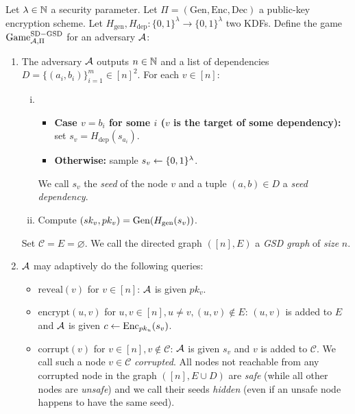 \begin{definition}

	Let $\lambda \in \mathbb{N}$ a security parameter.  Let $\Pi = (\mathrm{Gen}, \mathrm{Enc}, \mathrm{Dec})$ a public-key encryption scheme. Let $H_{\mathrm{gen}}, H_{\mathrm{dep}} \colon \{0, 1\}^\lambda \to \{0, 1\}^\lambda$ two KDFs. Define the game $\mathrm{Game}_{\mathcal{A}, \Pi}^{\mathrm{SD-GSD}}$ for an adversary $\mathcal{A}$:
	\begin{enumerate}[1.]
		\item \label{def:sd-gsd-game-step-1} The adversary $\mathcal{A}$ outputs $n \in \mathbb{N}$ and a list of dependencies $D = \{(a_{i}, b_{i})\}_{i=1}^m \in [n]^2$. For each $v \in [n]$:
		      \begin{enumerate}[(i)]
			      \item \begin{itemize}
				            \item \textbf{Case $v = b_i$ for some $i$ ($v$ is the target of some dependency):} set $s_v = H_{\mathrm{dep}}(s_{a_i})$.
				            \item \textbf{Otherwise:} sample $s_v \leftarrow \{0, 1\}^\lambda$.
			            \end{itemize}
			            We call $s_v$ the \emph{seed} of the node $v$ and a tuple $(a, b) \in D$ a \emph{seed dependency}.
			      \item Compute $(sk_v, pk_v) = \mathrm{Gen}(H_\mathrm{gen}(s_v))$. 
		      \end{enumerate}
		      Set $\mathcal{C} = E = \varnothing$. We call the directed graph $([n], E)$ a \emph{GSD graph} of \emph{size} $n$.
		\item $\mathcal{A}$ may adaptively do the following queries:
		      \begin{itemize}
			      \item $\mathrm{reveal}(v)$ for $v \in [n]$: $\mathcal{A}$ is given $pk_v$.
			      \item $\mathrm{encrypt}(u, v)$ for $u, v \in [n], u \neq v, (u, v) \notin E$: $(u, v)$ is added to $E$ and $\mathcal{A}$ is given $c \leftarrow \mathrm{Enc}_{pk_u}(s_v)$.
			      \item $\mathrm{corrupt}(v)$ for $v \in [n], v \notin \mathcal{C}$: $\mathcal{A}$ is given $s_v$ and $v$ is added to $\mathcal{C}$. We call such a node $v \in \mathcal{C}$ \emph{corrupted}. All nodes not reachable from any corrupted node in the graph $([n], E \cup D)$ are \emph{safe} (while all other nodes are \emph{unsafe}) and we call their seeds \emph{hidden} (even if an unsafe node happens to have the same seed).

\end{itemize}
\end{enumerate}
\end{definition}

